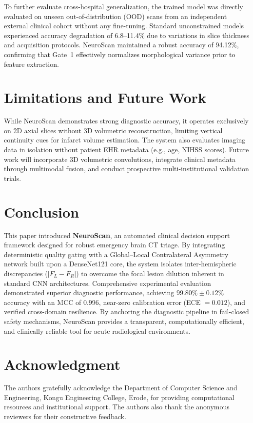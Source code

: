 \documentclass[conference]{IEEEtran}
\begin{document}
To further evaluate cross-hospital generalization, the trained model was directly evaluated on unseen out-of-distribution (OOD) scans from an independent external clinical cohort without any fine-tuning. Standard unconstrained models experienced accuracy degradation of 6.8--11.4\% due to variations in slice thickness and acquisition protocols. NeuroScan maintained a robust accuracy of 94.12\%, confirming that Gate~1 effectively normalizes morphological variance prior to feature extraction.

\section{Limitations and Future Work}
While NeuroScan demonstrates strong diagnostic accuracy, it operates exclusively on 2D axial slices without 3D volumetric reconstruction, limiting vertical continuity cues for infarct volume estimation. The system also evaluates imaging data in isolation without patient EHR metadata (e.g., age, NIHSS scores). Future work will incorporate 3D volumetric convolutions, integrate clinical metadata through multimodal fusion, and conduct prospective multi-institutional validation trials.

\section{Conclusion}
This paper introduced \textbf{NeuroScan}, an automated clinical decision support framework designed for robust emergency brain CT triage. By integrating deterministic quality gating with a Global--Local Contralateral Asymmetry network built upon a DenseNet121 core, the system isolates inter-hemispheric discrepancies ($|F_L - F_R|$) to overcome the focal lesion dilution inherent in standard CNN architectures. Comprehensive experimental evaluation demonstrated superior diagnostic performance, achieving $99.80\% \pm 0.12\%$ accuracy with an MCC of 0.996, near-zero calibration error (ECE $= 0.012$), and verified cross-domain resilience. By anchoring the diagnostic pipeline in fail-closed safety mechanisms, NeuroScan provides a transparent, computationally efficient, and clinically reliable tool for acute radiological environments.

\section*{Acknowledgment}
The authors gratefully acknowledge the Department of Computer Science and Engineering, Kongu Engineering College, Erode, for providing computational resources and institutional support. The authors also thank the anonymous reviewers for their constructive feedback.
\end{document}
